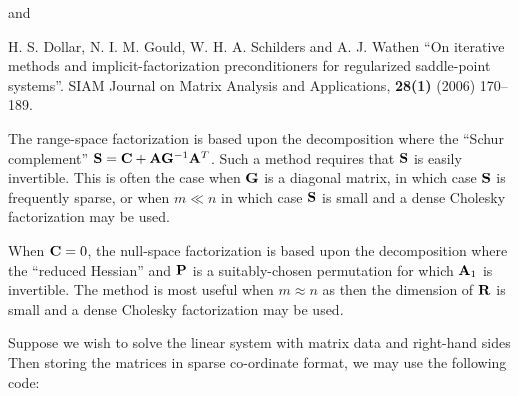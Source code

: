 \documentclass{galahad}
\begin{document}
\noindent
and

\noindent
H. S. Dollar, N. I. M. Gould, W. H. A. Schilders and A. J. Wathen
``On iterative methods and implicit-factorization preconditioners for
regularized saddle-point systems''.
SIAM Journal on Matrix Analysis and Applications, {\bf 28(1)} (2006) 170--189.
\vspace*{1mm}

\noindent
The range-space factorization is based upon the decomposition
where the ``Schur complement'' ${\mathbf{S}} = {\mathbf{C}} + {\mathbf{A}} {\mathbf{G}}^{-1} {\mathbf{A}}^T$.
Such a method requires that ${\mathbf{S}}$ is easily invertible. This is often the
case when ${\mathbf{G}}$ is a diagonal matrix, in which case ${\mathbf{S}}$ is frequently
sparse, or when $m \ll n$ in which case ${\mathbf{S}}$
is small and a dense Cholesky factorization may be used.
\vspace*{1mm}

\noindent
When ${\mathbf{C}} = 0$, the null-space factorization is based upon the decomposition
where the ``reduced Hessian''
and ${\mathbf{P}}$ is a suitably-chosen permutation for which ${\mathbf{A}}_1$ is invertible.
The method is most useful when $m \approx n$ as then the dimension
of ${\mathbf{R}}$ is small and a dense Cholesky factorization may be used.



\galexample
Suppose we wish to solve the linear system  with matrix data
and right-hand sides
Then storing the matrices in sparse co-ordinate format,
we may use the following code:
\end{document}
